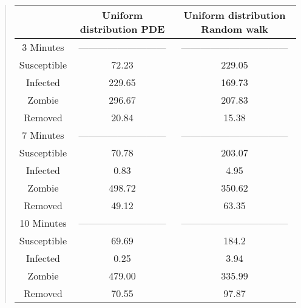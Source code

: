 \documentclass[%
twoside,                 %
final,                   %
chapterprefix=true,      %
open=right               %
10pt]{book}
\begin{document}
\begin{quote}
\begin{tabular}{ccc}
\hline
\multicolumn{1}{c}{  } & \multicolumn{1}{c}{ Uniform distribution PDE } & \multicolumn{1}{c}{ Uniform distribution Random walk } \\
\hline
3 Minutes                         & ---------------------------       & --------------------------------- \\
\hline
Susceptible                       & 72.23                             & 229.05                            \\
Infected                          & 229.65                            & 169.73                            \\
Zombie                            & 296.67                            & 207.83                            \\
Removed                           & 20.84                             & 15.38                             \\
\hline
7 Minutes                         & ---------------------------       & --------------------------------- \\
\hline
Susceptible                       & 70.78                             & 203.07                            \\
Infected                          & 0.83                              & 4.95                              \\
Zombie                            & 498.72                            & 350.62                            \\
Removed                           & 49.12                             & 63.35                             \\
\hline
10 Minutes                        & ---------------------------       & --------------------------------- \\
\hline
Susceptible                       & 69.69                             & 184.2                             \\
Infected                          & 0.25                              & 3.94                              \\
Zombie                            & 479.00                            & 335.99                            \\
Removed                           & 70.55                             & 97.87                             \\
\hline
\end{tabular}
\end{quote}
\end{document}

